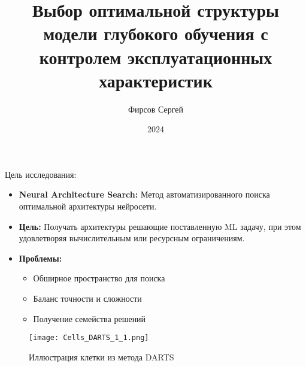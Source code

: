 \documentclass{beamer}
\title{Выбор оптимальной структуры модели глубокого обучения с контролем эксплуатационных характеристик}
\author{Фирсов Сергей }
\institute{Московский физико-технический институт}
\date{2024}
\begin{document}
\begin{frame}
    \titlepage
\end{frame} %


\begin{frame}{Цель исследования: }

\begin{itemize}
    \small
    \item \textbf{Neural Architecture Search:} 
    Метод автоматизированного поиска оптимальной архитектуры нейросети. 
    \item \textbf{Цель:} 
    Получать архитектуры решающие поставленную ML задачу, при этом удовлетворяя вычислительным или ресурсным ограничениям.
    \item \textbf{Проблемы:} %
    \begin{itemize}
        \footnotesize
        \item {Обширное пространство для поиска}
        \item {Баланс точности и сложности}
        \item {Получение семейства решений}
    \end{itemize}
    \end{itemize}
 
    \begin{figure}
        \centering
        \texttt{[image: Cells\_DARTS\_1\_1.png]}
        \caption*{Иллюстрация клетки из метода DARTS}
       
    \end{figure}
    

\end{frame} %
\end{document}
